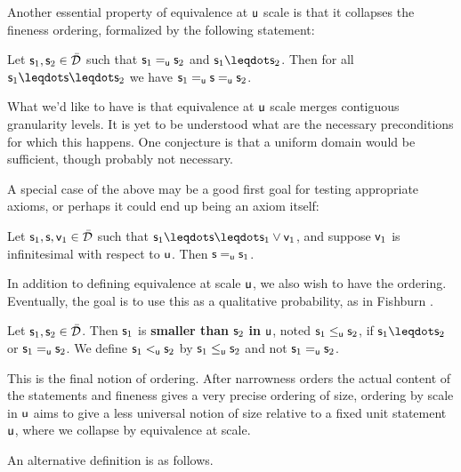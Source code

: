 \documentclass[10pt, onecolumn, longbibliography, nofootinbib]{revtex4-2}
\begin{document}
Another essential property of equivalence at $\stmt[u]$ scale is that it collapses the fineness ordering, formalized by the following statement:

\begin{desid}
	Let $\stmt_1, \stmt_2 \in \tdomain$ such that $\stmt_1 \equ \stmt_2$ and $\stmt_1 \finer \stmt_2$. Then for all $\stmt_1 \finer \stmt \finer \stmt_2$ we have $\stmt_1 \equ \stmt \equ \stmt_2$.
\end{desid}

\begin{remark}
	What we'd like to have is that equivalence at $\stmt[u]$ scale merges contiguous granularity levels. It is yet to be understood what are the necessary preconditions for which this happens. One conjecture is that a uniform domain would be sufficient, though probably not necessary.
\end{remark}

A special case of the above may be a good first goal for testing appropriate axioms, or perhaps it could end up being an axiom itself:

\begin{desid}
	Let $\stmt_1,\stmt,\stmt[v]_1\in\tdomain$ such that $\stmt_1\finer\stmt\finer\stmt_1\OR\stmt[v]_1$, and suppose $\stmt[v]_1$ is infinitesimal with respect to $\stmt[u]$. Then $\stmt\equ\stmt_1$. 
\end{desid}

In addition to defining equivalence at scale $\stmt[u]$, we also wish to have the ordering. Eventually, the goal is to use this as a qualitative probability, as in Fishburn \cite{fishburnsurvey}. 

\begin{defn}\label{smalleru}
	Let $\stmt_1, \stmt_2 \in \tdomain$. Then $\stmt_1$ is \textbf{smaller than} $\stmt_2$ \textbf{in} $\stmt[u]$, noted $\stmt_1 \lequ \stmt_2$, if $\stmt_1 \finer \stmt_2$ or $\stmt_1 \equ \stmt_2$. We define $\stmt_1\ltu\stmt_2$ by $\stmt_1\lequ\stmt_2$ and not $\stmt_1\equ\stmt_2$. 
\end{defn}

This is the final notion of ordering. After narrowness orders the actual content of the statements and fineness gives a very precise ordering of size, ordering by scale in $\stmt[u]$ aims to give a less universal notion of size relative to a fixed unit statement $\stmt[u]$, where we collapse by equivalence at scale. 

An alternative definition is as follows. 
\end{document}
